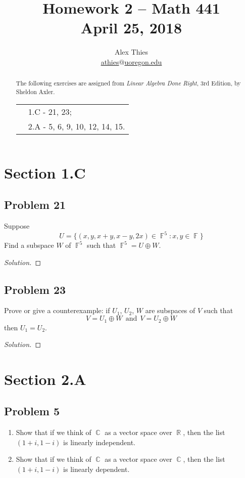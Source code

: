 \documentclass[letterpaper, 12pt]{amsart}
\DeclareMathOperator{\R}{\mathbb{R}}				%
\DeclareMathOperator{\F}{\mathbb{F}}				%
\DeclareMathOperator{\C}{\mathbb{C}}				%
\theoremstyle{definition}  							%
\begin{document}
	\title{Homework 2  -- Math 441 \\ A\lowercase{pril 25, 2018}}
	\author{Alex Thies \\ \href{mailto:athies@uoregon.edu}{\lowercase{athies$@$uoregon.edu}}}

	\begin{abstract}
	The following exercises are assigned from \textit{Linear Algebra Done Right}, 3rd Edition, by Sheldon Axler. 
			\begin{tabular}{rl}
				& 1.C - 21, 23; \\
				& 2.A - 5, 6, 9, 10, 12, 14, 15.
			\end{tabular}
	\end{abstract}

	\maketitle

	\section*{Section 1.C}
		\subsection*{Problem 21}
		Suppose $$U = \{(x, y, x+y, x-y, 2x) \in \F^{5} : x,y \in \F\}$$ Find a subspace $W$ of $\F^{5}$ such that $\F^{5} = U \oplus W$.

		\begin{proof}[Solution]
		\end{proof}

		\subsection*{Problem 23}
		Prove or give a counterexample: if $U_{1}$, $U_{2}$, $W$ are subspaces of $V$ such that $$V = U_{1} \oplus W \ \ \text{and} \ \ V = U_{2} \oplus W$$ then $U_{1} = U_{2}$.

		\begin{proof}[Solution]
		\end{proof}

	\section*{Section 2.A}
		\subsection*{Problem 5}
		\begin{enumerate}[\hspace*{5mm} (a)]
		\item Show that if we think of $\C$ as a vector space over $\R$, then the list $(1 + i, 1 - i)$ is linearly independent.
		\item Show that if we think of $\C$ as a vector space over $\C$, then the list $(1 + i, 1 - i)$ is linearly dependent.
		\end{enumerate}
\end{document}
